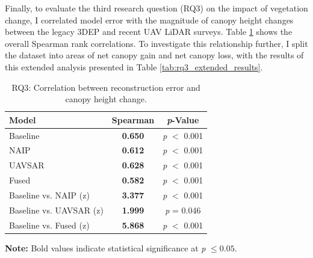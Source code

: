 \documentclass[12pt]{report}
\begin{document}
Finally, to evaluate the third research question (RQ3) on the impact of vegetation change, I correlated model error with the magnitude of canopy height changes between the legacy 3DEP and recent UAV LiDAR surveys. Table \ref{tab:rq3_results} shows the overall Spearman rank correlations. To investigate this relationship further, I split the dataset into areas of net canopy gain and net canopy loss, with the results of this extended analysis presented in Table \ref{tab:rq3_extended_results}.

\begin{table}[H]
\centering
\caption{RQ3: Correlation between reconstruction error and canopy height change.}
\begin{tabular}{lcc}
\toprule
\textbf{Model} & \textbf{Spearman \boldmath{$\rho$}} & \textbf{\textit{p}-Value} \\
\midrule
Baseline & \textbf{0.650
} & \emph{p} $<$ 0.001 \\
NAIP & \textbf{0.612} & \emph{p} $<$ 0.001 \\
UAVSAR & \textbf{0.628} & \emph{p} $<$ 0.001 \\
Fused & \textbf{0.582} & \emph{p} $<$ 0.001 \\
\midrule
Baseline vs. NAIP (z) & \textbf{3.377} & \emph{p} $<$ 0.001 \\
Baseline vs. UAVSAR (z) & \textbf{1.999} & \emph{p} = 0.046 \\
Baseline vs. Fused (z) & \textbf{5.868} & \emph{p} $<$ 0.001 \\
\bottomrule
\end{tabular}
\label{tab:rq3_results}

\vspace{2pt}
\footnotesize\textbf{Note:} Bold values indicate statistical significance at \emph{p} $\leq 0.05$.
\end{table}
\vspace{-10pt}
\end{document}
